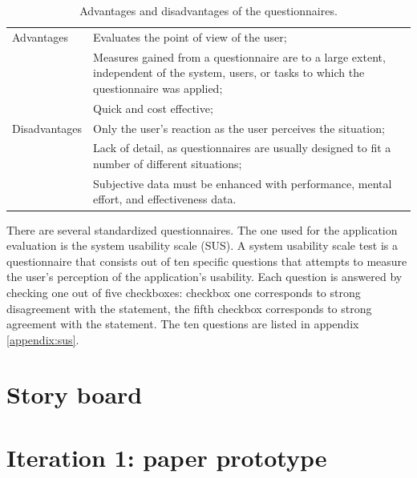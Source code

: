 \begin{table}%
	\begin{center}
		\begin{tabular}{l p{300px}}
			\hline
			Advantages		&		Evaluates the point of view of the user; \\
										&		Measures gained from a questionnaire are to a large extent, independent of the system, users, or tasks to which the questionnaire was applied; \\
										&		Quick and cost effective; \\
			\hline
			Disadvantages	&		Only the user's reaction as the user perceives the situation; \\
										&		Lack of detail, as questionnaires are usually designed to fit a number of different situations; \\
										&		Subjective data must be enhanced with performance, mental effort, and effectiveness data. \\
			\hline
		\end{tabular}
	\end{center}
	\caption{Advantages and disadvantages of the questionnaires.}
	\label{table:questionnaires}
\end{table}


There are several standardized questionnaires. The one used for the application evaluation is the system usability scale (SUS). A system usability scale test is a questionnaire that consists out of ten specific questions that attempts to measure the user's perception of the application's usability. Each question is answered by checking one out of five checkboxes: checkbox one corresponds to strong disagreement with the statement, the fifth checkbox corresponds to strong agreement with the statement\cite{sauro:2011}. The ten questions are listed in appendix \ref{appendix:sus}.


\section{Story board}


\section{Iteration 1: paper prototype}\label{chapter:prototype:section:paper}




